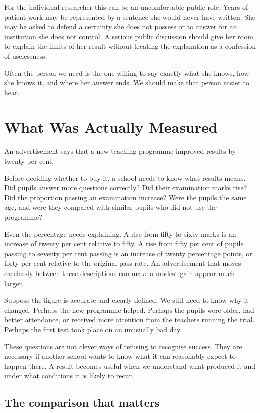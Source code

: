 \documentclass[12pt,a4paper]{book}
\begin{document}
For the individual researcher this can be an uncomfortable public role. Years of patient work may be represented by a sentence she would never have written. She may be asked to defend a certainty she does not possess or to answer for an institution she does not control. A serious public discussion should give her room to explain the limits of her result without treating the explanation as a confession of uselessness.

Often the person we need is the one willing to say exactly what she knows, how she knows it, and where her answer ends. We should make that person easier to hear.

\chapter{What Was Actually Measured}

An advertisement says that a new teaching programme improved results by twenty per cent.

Before deciding whether to buy it, a school needs to know what results means. Did pupils answer more questions correctly? Did their examination marks rise? Did the proportion passing an examination increase? Were the pupils the same age, and were they compared with similar pupils who did not use the programme?

Even the percentage needs explaining. A rise from fifty to sixty marks is an increase of twenty per cent relative to fifty. A rise from fifty per cent of pupils passing to seventy per cent passing is an increase of twenty percentage points, or forty per cent relative to the original pass rate. An advertisement that moves carelessly between these descriptions can make a modest gain appear much larger.

Suppose the figure is accurate and clearly defined. We still need to know why it changed. Perhaps the new programme helped. Perhaps the pupils were older, had better attendance, or received more attention from the teachers running the trial. Perhaps the first test took place on an unusually bad day.

These questions are not clever ways of refusing to recognise success. They are necessary if another school wants to know what it can reasonably expect to happen there. A result becomes useful when we understand what produced it and under what conditions it is likely to recur.

\section*{The comparison that matters}
\end{document}
